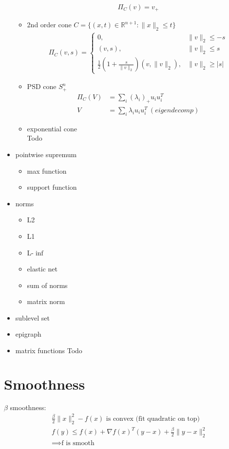 \documentclass[8pt,letter]{article}
\newcommand{\R}{\mathbb{R}}
\begin{document}
\begin{multicols*}{2}
\begin{itemize}
\begin{itemize}
        \begin{align*}
          \Pi_C(v)=v_+
        \end{align*}
      \item 2nd order cone $C=\{(x,t)\in \R^{n+1}: \|x\|_2 \leq t\}$
        \begin{align*}
          \Pi_C(v,s) = \begin{cases}
            0,& \|v\|_2 \leq -s\\
            (v,s),& \|v\|_2 \leq s\\
            \frac{1}{2}(1+\frac{s}{\|v\|_2})(v,\|v\|_2),& \|v\|_2 \geq |s|
          \end{cases}
        \end{align*}
      \item PSD cone $S_+^n$
        \begin{align*}
          \Pi_C(V)&=\sum_i (\lambda_i)_+ u_i u_i^T\\
          V&=\sum_i \lambda_i u_i u_i^T\ (eigendecomp)
        \end{align*}
      \item exponential cone\\
        Todo
      \end{itemize}
    \item pointwise supremum
      \begin{itemize}
      \item max function
      \item support function
      \end{itemize}
    \item norms
      \begin{itemize}
      \item L2
      \item L1
      \item L-$\inf$
      \item elastic net
      \item sum of norms
      \item matrix norm
      \end{itemize}
    \item sublevel set
    \item epigraph
    \item matrix functions
      Todo
    \end{itemize}

    \vfill\null
    \pagebreak
    
    \section{Smoothness}
    $\beta$ smoothness:
    \begin{align*}
      & \frac{\beta}{2} \|x\|_2^2 - f(x) \text{ is convex (fit quadratic on top)}\\
      & f(y) \leq f(x) + \nabla f(x)^T (y-x) + \frac{\beta}{2} \|y-x\|_2^2\\
      & \implies \text{f is smooth}
    \end{align*}


\end{multicols*}
\end{document}
